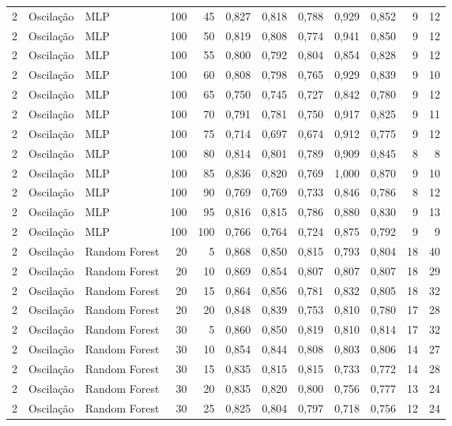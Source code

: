 \begin{longtable}{@{}rllrrrrrrrrr@{}}
2 & Oscilação & MLP & 100 & 45 & 0,827 & 0,818 & 0,788 & 0,929 & 0,852 & 9 & 12 \\
2 & Oscilação & MLP & 100 & 50 & 0,819 & 0,808 & 0,774 & 0,941 & 0,850 & 9 & 12 \\
2 & Oscilação & MLP & 100 & 55 & 0,800 & 0,792 & 0,804 & 0,854 & 0,828 & 9 & 12 \\
2 & Oscilação & MLP & 100 & 60 & 0,808 & 0,798 & 0,765 & 0,929 & 0,839 & 9 & 10 \\
2 & Oscilação & MLP & 100 & 65 & 0,750 & 0,745 & 0,727 & 0,842 & 0,780 & 9 & 12 \\
2 & Oscilação & MLP & 100 & 70 & 0,791 & 0,781 & 0,750 & 0,917 & 0,825 & 9 & 11 \\
2 & Oscilação & MLP & 100 & 75 & 0,714 & 0,697 & 0,674 & 0,912 & 0,775 & 9 & 12 \\
2 & Oscilação & MLP & 100 & 80 & 0,814 & 0,801 & 0,789 & 0,909 & 0,845 & 8 & 8 \\
2 & Oscilação & MLP & 100 & 85 & 0,836 & 0,820 & 0,769 & 1,000 & 0,870 & 9 & 10 \\
2 & Oscilação & MLP & 100 & 90 & 0,769 & 0,769 & 0,733 & 0,846 & 0,786 & 8 & 12 \\
2 & Oscilação & MLP & 100 & 95 & 0,816 & 0,815 & 0,786 & 0,880 & 0,830 & 9 & 13 \\
2 & Oscilação & MLP & 100 & 100 & 0,766 & 0,764 & 0,724 & 0,875 & 0,792 & 9 & 9 \\
2 & Oscilação & Random Forest & 20 & 5 & 0,868 & 0,850 & 0,815 & 0,793 & 0,804 & 18 & 40 \\
2 & Oscilação & Random Forest & 20 & 10 & 0,869 & 0,854 & 0,807 & 0,807 & 0,807 & 18 & 29 \\
2 & Oscilação & Random Forest & 20 & 15 & 0,864 & 0,856 & 0,781 & 0,832 & 0,805 & 18 & 32 \\
2 & Oscilação & Random Forest & 20 & 20 & 0,848 & 0,839 & 0,753 & 0,810 & 0,780 & 17 & 28 \\
2 & Oscilação & Random Forest & 30 & 5 & 0,860 & 0,850 & 0,819 & 0,810 & 0,814 & 17 & 32 \\
2 & Oscilação & Random Forest & 30 & 10 & 0,854 & 0,844 & 0,808 & 0,803 & 0,806 & 14 & 27 \\
2 & Oscilação & Random Forest & 30 & 15 & 0,835 & 0,815 & 0,815 & 0,733 & 0,772 & 14 & 28 \\
2 & Oscilação & Random Forest & 30 & 20 & 0,835 & 0,820 & 0,800 & 0,756 & 0,777 & 13 & 24 \\
2 & Oscilação & Random Forest & 30 & 25 & 0,825 & 0,804 & 0,797 & 0,718 & 0,756 & 12 & 24 \\

\end{longtable}
